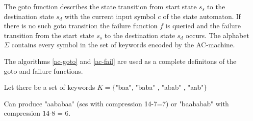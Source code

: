 \documentclass[english,twoside,censored,csm,algorithms-track-2020]{HYthesisML}
\theoremstyle{plain}
\theoremstyle{definition}
\begin{document}
  The goto function describes the state transition from start state $s_s$ to the destination state
  $s_d$ with the current input symbol $c$ of the state automaton. If there is no such goto transition
  the failure function $f$ is queried and the failure transition from the start state $s_s$ to
  the destination state $s_d$ occurs. The alphabet $\Sigma$ contains every symbol in the set of
  keywords encoded by the AC-machine.

  The algorithms \ref{ac-goto} and \ref{ac-fail} are used as a complete definitons of the goto and
  failure functions.

  Let there be a set of keywords $K=\{$"baa", "baba" , "abab" , "aab"$\}$

  Can produce "aababaa" (scs with compression 14-7=7) or "baababab" with compression 14-8 = 6.
\end{document}
